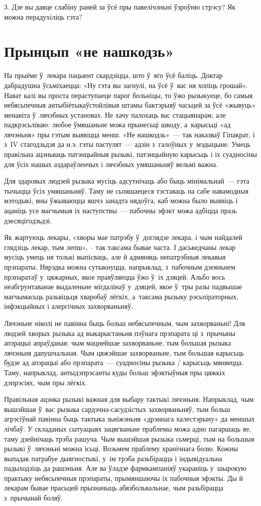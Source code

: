 3. Дзе вы даяце слабіну раней за ўсё пры павелічэньні ўзроўню стрэсу? Як можна перадухіліць гэта?


\section{Прынцып «не нашкодзь»}

На прыёме ў~лекара пацыент скардзіцца, што ў~яго ўсё баліць. Доктар дабрадушна ўсьміхаецца: «Ну гэта вы загнулі, на ўсё ў~вас ня хопіць грошай». Нават калі вы проста пераступаеце парог больніцы, то ўжо рызыкуеце, бо самыя небясьпечныя антыбіётыкаўстойлівыя штамы бактэрыяў часьцей за ўсё «жывуць» менавіта ў~лячэбных установах. Не хачу палохаць вас стацыянарам, але падкрэсьліваю: любое ўмяшаньне можа прынесьці шкоду, а~карысьці «ад лячэньня» пры гэтым выявіцца менш. «Не нашкодзь»~--- так наказваў Гіпакрат, і з~IV стагодзьдзя да н.э. гэты пастулят~--- адзін з~галоўных у~мэдыцыне. Умець правільна ацэньваць патэнцыйныя рызыкі, патэнцыйную карысьць і іх суадносіны для ўсіх нашых аздараўленчых і лячэбных умяшаньняў вельмі важна.

Для здаровых людзей рызыка мусіць адсутнічаць або быць мінімальнай~--- гэта тычыцца ўсіх умяшаньняў. Таму не сьпяшаецеся тэставаць на сабе навамодныя мэтодыкі, яны ўжываюцца яшчэ занадта нядоўга, каб можна было выявіць і ацаніць усе магчымыя іх наступствы~--- пабочны эфэкт можа адбіцца празь дзесяцігодзьдзі.

Як жартуюць лекары, «хворы мае патрэбу ў~доглядзе лекара, і чым найдалей глядзіць лекар, тым лепш», -- так таксама бывае часта. І дасьведчаны лекар мусіць умець ня толькі выпісваць, але й адмяняць непатрэбныя лекавыя прэпараты. Нярэдка можна сутыкнуцца, напрыклад, з~пабочным дзеяньнем прэпаратаў у~цяжарных, якое праяўляецца ўжо ў~іх дзяцей. Альбо вось неабгрунтаванае выдаленьне мігдалінаў у~дзяцей, якое ў~тры разы падвышае магчымасьць разьвіцьця хваробаў лёгкіх, а~таксама рызыку рэсьпіраторных, інфэкцыйных і алергічных захворваньняў.

Лячэньне ніколі не павінна быць больш небясьпечным, чым захворваньні! Для людзей хворых рызыка ад выкарыстаньня пэўнага прэпарата ці з~прычыны апэрацыі апраўданая: чым мацнейшае захворваньне, тым большая рызыка лячэньня дапушчальная. Чым цяжэйшае захворваньне, тым большая карысьць будзе ад апэрацыі або прэпарата~--- суадносіны рызыка / карысьць мяняецца. Таму, напрыклад, антыдэпрэсанты куды больш эфэктыўныя пры цяжкіх дэпрэсіях, чым пры лёгкіх.

Правільная ацэнка рызыкі важная для выбару тактыкі лячэньня. Напрыклад, чым вышэйшая ў~вас рызыка сардэчна-сасудзістых захворваньняў, тым больш агрэсіўнай павінна быць тактыка зьніжэньня «дрэннага халестэрыну» да меншых лічбаў. У складаных сытуацыях зацягваньне праблемы можа адно пагаршаць яе, таму дзейнічаць трэба рашуча. Чым вышэйшая рызыка сьмерці, тым на большыя рызыкі ў~лячэньні можна ісьці. Возьмем праблему хранічнага болю. Кожны выпадак патрабуе дыягностыкі, у~ім трэба разьбірацца і індывідуальна падыходзіць да рашэньня. Але ва ўладзе фармкампаніяў укараніць у~шырокую практыку небясьпечныя прэпараты, прымяншаючы іх пабочныя эфэкты. Ды й лекарам бывае прасьцей прызначыць абязбольвальнае, чым разьбірацца з~прычынай боляў.

